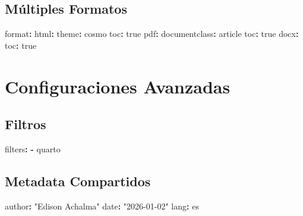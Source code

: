 \documentclass[
  doc,
  floatsintext,
  longtable,
  a4paper,
  nolmodern,
  notxfonts,
  notimes,
  12pt,
  colorlinks=true,linkcolor=blue,citecolor=blue,urlcolor=blue]{apa7}
\newenvironment{Shaded}{\begin{snugshade}}{\end{snugshade}}
\newcommand{\AttributeTok}[1]{\textcolor[rgb]{0.40,0.45,0.13}{#1}}
\newcommand{\CharTok}[1]{\textcolor[rgb]{0.13,0.47,0.30}{#1}}
\newcommand{\FunctionTok}[1]{\textcolor[rgb]{0.28,0.35,0.67}{#1}}
\newcommand{\KeywordTok}[1]{\textcolor[rgb]{0.00,0.23,0.31}{\textbf{#1}}}
\newcommand{\StringTok}[1]{\textcolor[rgb]{0.13,0.47,0.30}{#1}}
\begin{document}
\subsection{Múltiples Formatos}\label{muxfaltiples-formatos}

\begin{Shaded}
\begin{Highlighting}[]
\FunctionTok{format}\KeywordTok{:}
\AttributeTok{  }\FunctionTok{html}\KeywordTok{:}
\AttributeTok{    }\FunctionTok{theme}\KeywordTok{:}\AttributeTok{ cosmo}
\AttributeTok{    }\FunctionTok{toc}\KeywordTok{:}\AttributeTok{ }\CharTok{true}
\AttributeTok{    }
\AttributeTok{  }\FunctionTok{pdf}\KeywordTok{:}
\AttributeTok{    }\FunctionTok{documentclass}\KeywordTok{:}\AttributeTok{ article}
\AttributeTok{    }\FunctionTok{toc}\KeywordTok{:}\AttributeTok{ }\CharTok{true}
\AttributeTok{    }
\AttributeTok{  }\FunctionTok{docx}\KeywordTok{:}
\AttributeTok{    }\FunctionTok{toc}\KeywordTok{:}\AttributeTok{ }\CharTok{true}
\end{Highlighting}
\end{Shaded}

\section{Configuraciones Avanzadas}\label{configuraciones-avanzadas}

\subsection{Filtros}\label{filtros}

\begin{Shaded}
\begin{Highlighting}[]
\FunctionTok{filters}\KeywordTok{:}
\AttributeTok{  }\KeywordTok{{-}}\AttributeTok{ quarto}
\end{Highlighting}
\end{Shaded}

\subsection{Metadata Compartidos}\label{metadata-compartidos}

\begin{Shaded}
\begin{Highlighting}[]
\FunctionTok{author}\KeywordTok{:}\AttributeTok{ }\StringTok{"Edison Achalma"}
\FunctionTok{date}\KeywordTok{:}\AttributeTok{ }\StringTok{"2026{-}01{-}02"}
\FunctionTok{lang}\KeywordTok{:}\AttributeTok{ es}
\end{Highlighting}
\end{Shaded}
\end{document}
